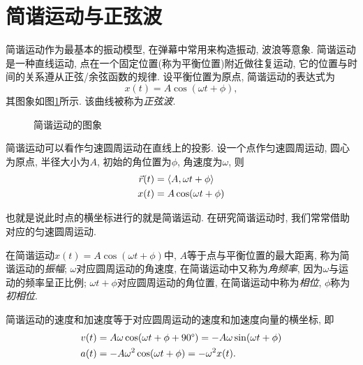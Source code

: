 \section{简谐运动与正弦波} \label{sec:curve-wave}

简谐运动作为最基本的振动模型,
在弹幕中常用来构造振动, 波浪等意象.
简谐运动是一种直线运动,
点在一个固定位置(称为平衡位置)附近做往复运动,
它的位置与时间的关系遵从正弦/余弦函数的规律.
设平衡位置为原点, 简谐运动的表达式为
\[
  x(t) = A\cos(\omega t+\phi),
\]
其图象如图\ref{fig:graph-sine}所示.
该曲线被称为\emph{正弦波}.

\begin{figure}[htbp]
  \centering
  \caption{简谐运动的图象}
  \label{fig:graph-sine}
\end{figure}

简谐运动可以看作匀速圆周运动在直线上的投影.
设一个点作匀速圆周运动, 圆心为原点, 半径大小为$A$,
初始的角位置为$\phi$, 角速度为$\omega$, 则
\begin{align*}
  \vec r(t) & = \braket{A, \omega t + \phi} \\
  x(t)      & = A\cos(\omega t + \phi)
\end{align*}

也就是说此时点的横坐标进行的就是简谐运动.
在研究简谐运动时, 我们常常借助对应的匀速圆周运动.

在简谐运动$x(t) = A\cos(\omega t + \phi)$中,
$A$等于点与平衡位置的最大距离, 称为简谐运动的\emph{振幅};
$\omega$对应圆周运动的角速度, 在简谐运动中又称为\emph{角频率},
因为$\omega$与运动的频率呈正比例;
$\omega t+\phi$对应圆周运动的角位置,
在简谐运动中称为\emph{相位}, $\phi$称为\emph{初相位}.

简谐运动的速度和加速度等于对应圆周运动的速度和加速度向量的横坐标, 即
\begin{align*}
  v(t) & = A\omega\cos(\omega t+\phi + 90\degree)
  = -A\omega\sin(\omega t+\phi)                   \\
  a(t) & = -A\omega^2\cos(\omega t+\phi)
  = -\omega^2 x(t).
\end{align*}

